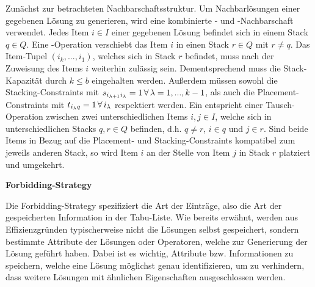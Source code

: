 Zunächst zur betrachteten Nachbarschaftsstruktur. Um Nachbarlösungen einer gegebenen Lösung zu generieren,
wird eine kombinierte - und -Nachbarschaft verwendet.
Jedes Item $i \in I$ einer gegebenen Lösung befindet sich in einem Stack $q \in Q$.
Eine -Operation verschiebt das Item $i$ in einen Stack $r \in Q$ mit $r \neq q$.
Das Item-Tupel $(i_k, ..., i_1)$, welches sich in Stack $r$ befindet, muss nach der Zuweisung des Items $i$
weiterhin zulässig sein. Dementsprechend muss die Stack-Kapazität durch $k \leq b$ eingehalten werden.
Außerdem müssen sowohl die Stacking-Constraints mit $s_{i_{\lambda + 1}i_\lambda} = 1 \thinspace \forall \thinspace
\lambda = 1, ..., k - 1$, als auch die Placement-Constraints mit $t_{i_\lambda q} = 1 \thinspace \forall
\thinspace i_\lambda$ respektiert werden.
Ein  entspricht einer Tausch-Operation zwischen zwei unterschiedlichen Items $i, j \in I$,
welche sich in unterschiedlichen Stacks $q, r \in Q$ befinden, d.h. $q \neq r$, $i \in q$ und $j \in r$.
Sind beide Items in Bezug auf die Placement- und Stacking-Constraints kompatibel zum jeweils anderen Stack,
so wird Item $i$ an der Stelle von Item $j$ in Stack $r$ platziert und umgekehrt.

\textbf{Forbidding-Strategy}

Die Forbidding-Strategy spezifiziert die Art der Einträge, also die Art der gespeicherten Information in der
Tabu-Liste. Wie bereits erwähnt, werden aus Effizienzgründen typischerweise nicht die Lösungen selbst gespeichert,
sondern bestimmte Attribute der Lösungen oder Operatoren, welche zur Generierung der Lösung geführt haben.
Dabei ist es wichtig, Attribute bzw. Informationen zu speichern, welche eine Lösung möglichst genau identifizieren,
um zu verhindern, dass weitere Lösungen mit ähnlichen Eigenschaften ausgeschlossen werden.

